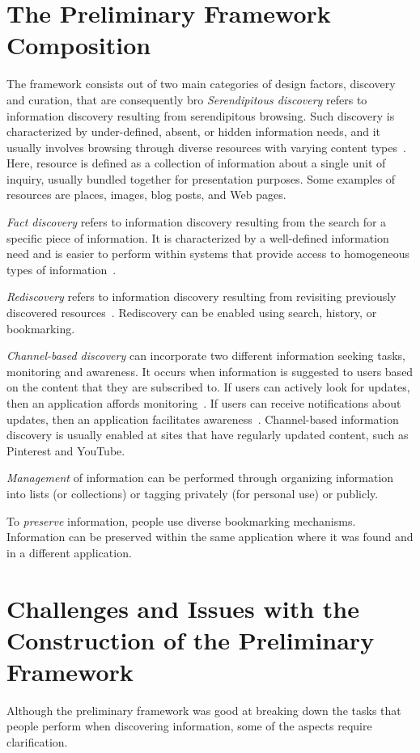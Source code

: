 {\section{The Preliminary Framework Composition}
The framework consists out of two main categories of design factors, discovery and curation, that are consequently bro
\textit{Serendipitous discovery} refers to information discovery resulting from serendipitous browsing. Such discovery is characterized by under-defined, absent, or hidden information needs, and it usually involves browsing through diverse resources with varying content types~\cite{kellar2006goal, kellar2007field}. Here, resource is defined as a collection of information about a single unit of inquiry, usually bundled together for presentation purposes. Some examples of resources are places, images, blog posts, and Web pages.

\textit{Fact discovery} refers to information discovery resulting from the search for a specific piece of information. It is characterized by a well-defined information need and is easier to perform within systems that provide access to homogeneous types of information~\cite{kellar2006goal, lindley2012s}.

\textit{Rediscovery} refers to information discovery resulting from revisiting previously discovered resources~\cite{tauscher1997people}. Rediscovery can be enabled using search, history, or bookmarking.

\textit{Channel-based discovery} can incorporate two different information seeking tasks, monitoring and awareness. It occurs when information is suggested to users based on the content that they are subscribed to. If users can actively look for updates, then an application affords monitoring~\cite{morrison2001taxonomic}. If users can receive notifications about updates, then an application facilitates awareness~\cite{bates1986exploratory,bates2002toward}. Channel-based information discovery is usually enabled at sites that have regularly updated content, such as Pinterest and YouTube.    

\textit{Management} of information can be performed through organizing information into lists (or collections) or tagging privately (for personal use) or publicly.  

To \textit{preserve} information, people use diverse bookmarking mechanisms. Information can be preserved within the same application where it was found and in a different application.

} %
{\section{Challenges and Issues with the Construction of the Preliminary Framework}
Although the preliminary framework was good at breaking down the tasks that people perform when discovering information, some of the aspects require clarification. 
} %


